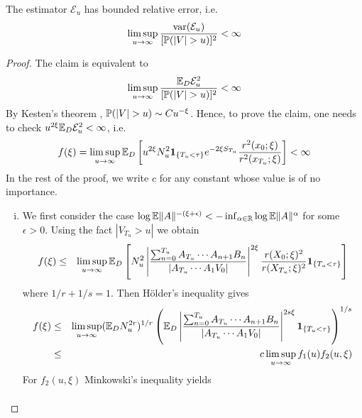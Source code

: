 \documentclass{article}
\begin{document}
\begin{theorem}
  The estimator $\mathcal E_u$ has bounded relative error, i.e.
  \begin{equation*}
    \limsup_{u \to \infty} {\var(\mathcal E_u) \over [\P(|V| > u)]^2} < \infty
  \end{equation*}
\end{theorem}
\begin{proof}
  The claim is equivalent to
  \[
  \limsup_{u \to \infty} {\E_D \mathcal E_u^2 \over [\P(|V| > u)]^2} < \infty
  \]
  By Kesten's theorem \cite{Kesten1973}, $\P(|V| > u) \sim C
  u^{-\xi}$. Hence, to prove the claim, one needs to check
  $u^{2\xi}\E_D \mathcal E_u^2 < \infty$, i.e.
  \[
  f(\xi) = \limsup_{u \to \infty} \E_D  \left[u^{2\xi}
    N_u^2 \1{T_u < \tau} e^{-2\xi S_{T_u}} {r^2(x_0; \xi)
      \over r^2(x_{T_u}; \xi)}\right]
  < \infty
  \]
  In the rest of the proof, we write $c$ for any constant whose value
  is of no importance.
  \begin{enumerate}[(i)]
  \item We first consider the case $\log \E \|A\|^{-(\xi + \epsilon)}
    < -\inf_{\alpha \in \mathbb R} \log \E \|A\|^\alpha$ for some
    $\epsilon > 0$. Using the fact $|V_{T_u} > u|$  we obtain
  \begin{eqnarray*}
    f(\xi) &\leq& \limsup_{u \to \infty} \E_D \left[
                  N_u^2  \left|
                  \frac{
                  \sum_{n=0}^{T_u} A_{T_u} \cdots A_{n+1} B_n 
                  }{
                  |A_{T_u} \cdots A_1 V_0|
                  }
                  \right|^{2 \xi}
                  \frac{
                  r(X_0; \xi)^2
                  }{
                  r(X_{T_u}; \xi)^2
                  } \1{T_u < \tau}
    \right] \\
  \end{eqnarray*}
  where $1/r + 1/s = 1$. Then H\"older's inequality gives
  \begin{eqnarray*}
    f(\xi) &\leq& \limsup_{u \to \infty} (\E_D N_u^{2r})^{1/r}
                  \left(\E_D \left|
                  \frac{
                  \sum_{n=0}^{T_u} A_{T_u} \cdots A_{n+1} B_n 
                  }{
                  |A_{T_u} \cdots A_1 V_0|
                  }
                  \right|^{2 s \xi} \1{T_u < \tau}
                  \right)^{1/s} \\
           &\leq& c \limsup_{u \to \infty} f_1(u) f_2(u, \xi)
  \end{eqnarray*}
  For $f_2(u,\xi)$ Minkowski's inequality yields
  \begin{eqnarray*}

\end{eqnarray*}
\end{enumerate}
\end{proof}
\end{document}
